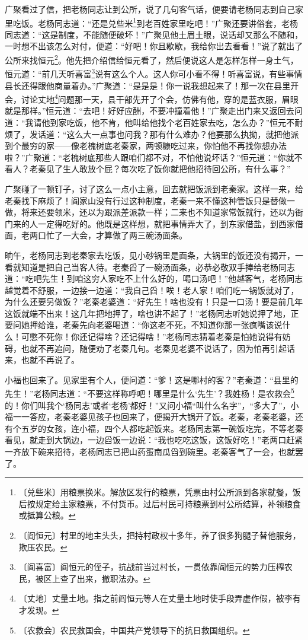 \documentclass[12pt,UTF-8,openany]{ctexbook}
\begin{document}
\begin{normalsize}
    广聚看过了信，把老杨同志让到公所，说了几句客气话，便要请老杨同志到自己家里吃饭。老杨同志道：“还是兑些米\footnote{〔兑些米〕用粮票换米。解放区发行的粮票，凭票由村公所派到各家就餐，饭后按规定给主家粮票，不付货币。过后村民可持粮票到村公所结算，补领粮食或抵算公粮。}到老百姓家里吃吧！”广聚还要讲俗套，老杨同志道：“这是制度，不能随便破坏！”广聚见他土眉土眼，说话却又那么不随和，一时想不出该怎么对付，便道：“好吧！你且歇歇，我给你出去看看！”说了就出了公所来找恒元\footnote{〔阎恒元〕村里的地主头头，把持村政权十多年，养了很多狗腿子替他服务，欺压农民。}。他先把介绍信给恒元看了，然后便说这人是怎样怎样一身土气，恒元道：“前几天听喜富\footnote{〔阎喜富〕阎恒元的侄子，抗战前当过村长，一贯依靠阎恒元的势力压榨农民，被区上查了出来，撤职法办。}说有这么个人。这人你可小看不得！听喜富说，有些事情县长还得跟他商量着办。”广聚道：“是是是！你一说我想起来了！那一次在县里开会，讨论丈地\footnote{〔丈地〕丈量土地。指之前阎恒元等人在丈量土地时使手段弄虚作假，被李有才发现。}问题那一天，县干部先开了个会，仿佛有他，穿的是蓝衣服，眉眼就是那样。”恒元道：“去吧！好好应酬，不要冲撞着他！”广聚走出门来又返回去问道：“我请他到家吃饭，他不肯，他叫给他找个老百姓家去吃，怎么办？”恒元不耐烦了，发话道：“这么大一点事也问我？那有什么难办？他要那么执拗，就把他派到个最穷的家——像老槐树底老秦家，两顿糠吃过来，你怕他不再找你想办法啦？”广聚道：“老槐树底那些人跟咱们都不对，不怕他说坏话？”恒元道：“你就不看人？老秦见了生人敢放个屁？每次吃了饭你就把他招待回公所，有什么事？”
    
    广聚碰了一顿钉子，讨了这么一点小主意，回去就把饭派到老秦家。这样一来，给老秦找下麻烦了！阎家山没有行过这种制度，老秦一来不懂这种管饭只是替做一做，将来还要领米，还以为跟派差派款一样；二来也不知道家常饭就行，还以为衙门来的人一定得吃好的。他既是这样想，就把事情弄大了，到东家借盐，到西家借面，老两口忙了一大会，才算做了两三碗汤面条。
    
    晌午，老杨同志到老秦家去吃饭，见小砂锅里是面条，大锅里的饭还没有揭开，一看就知道是把自己当客人待。老秦舀了一碗汤面条，必恭必敬双手捧给老杨同志道：“吃吧先生！到咱这穷人家吃不上什么好的，喝口汤吧！”他越客气，老杨同志越觉着不舒服，一边接一边道：“我自己舀！唉！老人家！咱们吃一锅饭就对了，为什么还要另做饭？”老秦老婆道：“好先生！啥也没有！只是一口汤！要是前几年这饭就端不出来！这几年把地押了，啥也讲不起了！”老杨同志听她说押了地，正要问她押给谁，老秦先向老婆喝道：“你这老不死，不知道你那一张疯嘴该说什么！可憋不死你！你还记得啥？还记得啥！”老杨同志猜着老秦是怕她说得有妨碍，也就不再追问，随便劝了老秦几句。老秦见老婆不说话了，因为怕再引起话来，也就不再说了。
    
    小福也回来了。见家里有个人，便问道：“爹！这是哪村的客？”老秦道：“县里的先生！”老杨同志道：“不要这样称呼吧！哪里是什么‘先生’？我姓杨！是农救会\footnote{〔农救会〕农民救国会，中国共产党领导下的抗日救国组织。}的！你们叫我个‘杨同志’或者‘老杨’都好！”又问小福“叫什么名字”，“多大了”，小福一一答应，老秦老婆见孩子也回来了，便揭开大锅开了饭。老秦，老秦老婆，还有个五岁的女孩，连小福，四个人都吃起饭来。老杨同志第一碗饭吃完，不等老秦看见，就走到大锅边，一边舀饭一边说：“我也吃吃这饭，这饭好吃！”老两口赶紧一齐放下碗来招待，老杨同志已把山药蛋南瓜舀到碗里。老秦客气了一会，也就罢了。
    

\end{normalsize}
\end{document}
